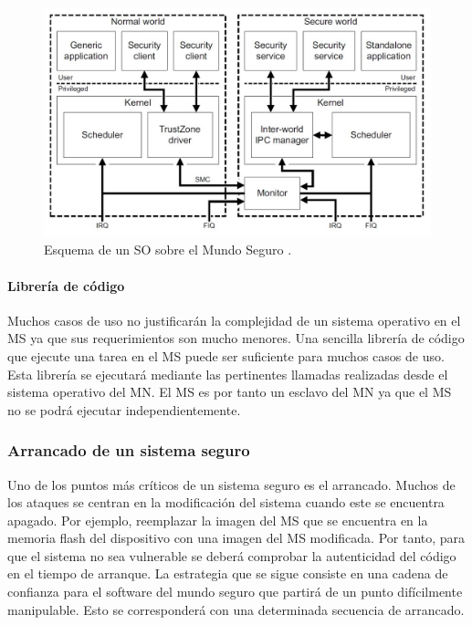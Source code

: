 \begin{figure}
	\centering
	\includegraphics[width=1\textwidth]{imagenes/secureSO.jpg}
	\caption{\label{fig1}Esquema de un SO sobre el Mundo Seguro \cite{trustzone}.}
\end{figure}

\paragraph{Librería de código}
Muchos casos de uso no justificarán la complejidad de un sistema operativo en el MS ya que sus requerimientos son mucho menores. Una sencilla librería de código que ejecute una tarea en el MS puede ser suficiente para muchos casos de uso. Esta librería se ejecutará mediante las pertinentes llamadas realizadas desde el sistema operativo del MN. El MS es por tanto un esclavo del MN ya que el MS no se podrá ejecutar independientemente.

\subsubsection{Arrancado de un sistema seguro}
Uno de los puntos más críticos de un sistema seguro es el arrancado. Muchos de los ataques se centran en la modificación del sistema cuando este se encuentra apagado. Por ejemplo, reemplazar la imagen del MS que se encuentra en la memoria flash del dispositivo con una imagen del MS modificada. Por tanto, para que el sistema no sea vulnerable se deberá comprobar la autenticidad del código en el tiempo de arranque. La estrategia que se sigue consiste en una cadena de confianza para el software del mundo seguro que partirá de un punto difícilmente manipulable. Esto se corresponderá con una determinada secuencia de arrancado.

